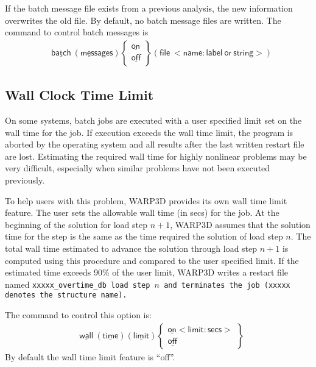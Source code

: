 \documentclass[11pt]{report}
\numberwithin{equation}{section}
\newcommand{\nf} {\normalfont}
\newcommand{\nin} {\noindent}
\newcommand{\ul} {\underline}
\newcommand{\hv} {\mathsf}   %
\begin{document}
\nin If the batch message file exists from a previous analysis, the new information 
overwrites the old file. By default, no batch message files are written. 
The command to control batch messages is
\begin{align*}
&\hv{\ul{batch}\  (\ul{mess}ages) }
\begin{Bmatrix}
\hv{\ul{on}}\\ \hv{\ul{off}}
\end{Bmatrix}
\hv{(file\ <name:label\ or\ string>)}
\end{align*}

\subsection{Wall Clock Time Limit}
\nin On some systems, batch jobs are executed with a user specified limit set on the wall time for 
the job. If execution exceeds the wall time limit, the program is aborted by 
the operating system and all results after the last written restart file are lost. Estimating the 
required wall time for highly nonlinear problems may be very difficult, especially when 
similar problems have not been executed previously.

To help users with this problem, WARP3D provides its own wall time limit feature. The user 
sets the allowable wall time (in secs) for the job. At the beginning of the solution 
for load step $n+1$, WARP3D assumes that the solution time for the step is the same as 
the time required the solution of load step $n$. The total wall time estimated to advance 
the solution through load step $n+1$ is computed using this procedure and compared 
to the user specified limit. If the estimated time exceeds 90\% of the user limit, 
WARP3D writes a restart file named \tt{xxxxx\_overtime\_db} \nf  load step $n$ 
and terminates the 
job (\tt{xxxxx} \nf denotes the structure name).

The command to control this option is:
\begin{align*}
&\hv{\ul{wall}\  (\ul{time}) (\ul{limit}) }
\begin{Bmatrix}
\hv{\ul{on} <limit:secs>}\\ \hv{\ul{off}}
\end{Bmatrix}
\end{align*}
\nin By default the wall time limit feature is ``off''.
\end{document}
